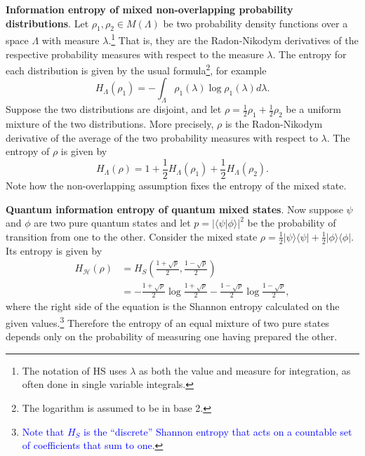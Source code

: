 \documentclass[10pt,twocolumn, nofootinbib]{revtex4-2}
\begin{document}
\textbf{Information entropy of mixed non-overlapping probability distributions}. Let $\rho_1, \rho_2 \in M(\Lambda)$ be two probability density functions over a space $\Lambda$ with measure $\lambda$.\footnote{The notation of HS uses $\lambda$ as both the value and measure for integration, as often done in single variable integrals.} That is, they are the Radon-Nikodym derivatives of the respective probability measures with respect to the measure $\lambda$. The entropy for each distribution is given by the usual formula\footnote{The logarithm is assumed to be in base 2.}, for example
\begin{equation}\label{shannon_entropy}
	H_\Lambda(\rho_1) = - \int_\Lambda \rho_1(\lambda) \log \rho_1(\lambda) d\lambda.
\end{equation}
Suppose the two distributions are disjoint, and let $\rho = \frac{1}{2} \rho_1 + \frac{1}{2} \rho_2$ be a uniform mixture of the two distributions. More precisely, $\rho$ is the Radon-Nikodym derivative of the average of the two probability measures with respect to $\lambda$. The entropy of $\rho$ is given by
\begin{equation}\label{entropy_nonoverlap}
	H_\Lambda(\rho) = 1 + \frac{1}{2} H_\Lambda(\rho_1) + \frac{1}{2} H_\Lambda(\rho_2).
\end{equation}
Note how the non-overlapping assumption fixes the entropy of the mixed state. 

\textbf{Quantum information entropy of quantum mixed states}. Now suppose $\psi$ and $\phi$ are two pure quantum states and let $p = | \langle \psi | \phi \rangle |^2$ be the probability of transition from one to the other. Consider the mixed state $\rho = \frac{1}{2} | \psi \rangle \langle \psi | + \frac{1}{2} | \phi \rangle \langle \phi |$. Its entropy is given by
\begin{equation}\label{entropy_mixed}
	\begin{aligned}
	H_\mathcal{H}(\rho) &= H_S\left(\frac{1+\sqrt{p}}{2}, \frac{1-\sqrt{p}}{2}\right) \\
	&= - \frac{1+\sqrt{p}}{2} \log \frac{1+\sqrt{p}}{2} - \frac{1-\sqrt{p}}{2} \log \frac{1-\sqrt{p}}{2} ,
	\end{aligned}
\end{equation}
where the right side of the equation is the Shannon entropy calculated on the given values.\footnote{\textcolor{blue}{Note that $H_S$ is the ``discrete'' Shannon entropy that acts on a countable set of coefficients that sum to one.}} Therefore the entropy of an equal mixture of two pure states depends only on the probability of measuring one having prepared the other.
\end{document}
